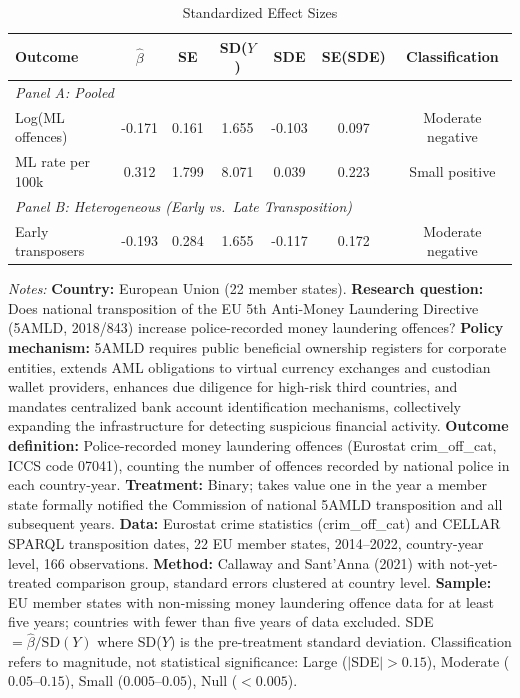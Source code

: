 \begin{table}[htbp]
\centering
\caption{Standardized Effect Sizes}
\label{tab:sde}
\begin{threeparttable}
\begin{tabular}{lcccccc}
\toprule
Outcome & $\hat{\beta}$ & SE & SD($Y$) & SDE & SE(SDE) & Classification \\
\midrule
\multicolumn{7}{l}{\textit{Panel A: Pooled}} \\
Log(ML offences) & -0.171 & 0.161 & 1.655 & -0.103 & 0.097 & Moderate negative \\
ML rate per 100k & 0.312 & 1.799 & 8.071 & 0.039 & 0.223 & Small positive \\
\midrule
\multicolumn{7}{l}{\textit{Panel B: Heterogeneous (Early vs.\ Late Transposition)}} \\
Early transposers & -0.193 & 0.284 & 1.655 & -0.117 & 0.172 & Moderate negative \\
\bottomrule
\end{tabular}
\begin{tablenotes}[flushleft]\small
\item \textit{Notes:} \textbf{Country:} European Union (22 member states). \textbf{Research question:} Does national transposition of the EU 5th Anti-Money Laundering Directive (5AMLD, 2018/843) increase police-recorded money laundering offences? \textbf{Policy mechanism:} 5AMLD requires public beneficial ownership registers for corporate entities, extends AML obligations to virtual currency exchanges and custodian wallet providers, enhances due diligence for high-risk third countries, and mandates centralized bank account identification mechanisms, collectively expanding the infrastructure for detecting suspicious financial activity. \textbf{Outcome definition:} Police-recorded money laundering offences (Eurostat crim\_off\_cat, ICCS code 07041), counting the number of offences recorded by national police in each country-year. \textbf{Treatment:} Binary; takes value one in the year a member state formally notified the Commission of national 5AMLD transposition and all subsequent years. \textbf{Data:} Eurostat crime statistics (crim\_off\_cat) and CELLAR SPARQL transposition dates, 22 EU member states, 2014--2022, country-year level, 166 observations. \textbf{Method:} Callaway and Sant'Anna (2021) with not-yet-treated comparison group, standard errors clustered at country level. \textbf{Sample:} EU member states with non-missing money laundering offence data for at least five years; countries with fewer than five years of data excluded. SDE $= \hat{\beta} / \text{SD}(Y)$ where SD($Y$) is the pre-treatment standard deviation. Classification refers to magnitude, not statistical significance: Large ($|$SDE$| > 0.15$), Moderate ($0.05$--$0.15$), Small ($0.005$--$0.05$), Null ($< 0.005$).
\end{tablenotes}
\end{threeparttable}
\end{table}
